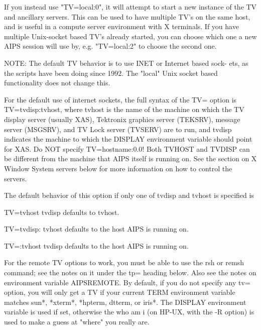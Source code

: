                If  you  instead  use  "TV=local:0",  it  will  attempt to start a new
               instance of the TV and ancillary servers.  This can be  used  to  have
               multiple  TV's  on  the  same  host, and is useful in a compute server
               environment with X terminals.  If you have multiple Unix-socket  based
               TV's already started, you can choose which one a new AIPS session will
               use by, e.g. "TV=local:2" to choose the second one.

               NOTE: The default TV behavior is to use  INET or Internet based  sock-
               ets,  as  the  scripts  have  been doing since 1992.  The "local" Unix
               socket based functionality does not change this.

               For the default use of internet sockets, the full syntax  of  the  TV=
               option is TV=tvdisp:tvhost, where tvhost is the name of the machine on
               which the TV display server (usually XAS), Tektronix  graphics  server
               (TEKSRV),  message server (MSGSRV), and TV Lock server (TVSERV) are to
               run, and tvdisp indicates the machine to which the DISPLAY environment
               variable  should point for XAS.  Do NOT specify TV=hostname:0.0!  Both
               TVHOST and TVDISP can be different from the machine that  AIPS  itself
               is  running  on.  See the section on X Window System servers below for
               more information on how to control the servers.

               The default behavior of this option  if only one of tvdisp and  tvhost
               is specified is

               TV=tvhost   tvdisp defaults to tvhost.

               TV=tvdisp:  tvhost defaults to the host AIPS is running on.

               TV=:tvhost  tvdisp defaults to the host AIPS is running on.

               For  the remote TV options to work, you must be able to use the rsh or
               remsh command; see the notes on it under the tp= heading below.   Also
               see  the notes on environment variable AIPSREMOTE.  By default, if you
               do not specify any tv= option, you will only get a TV if your  current
               TERM  environment  variable matches sun*, *xterm*, *hpterm, dtterm, or
               iris*.  The DISPLAY environment variable is used if set, otherwise the
               who  am  i  (on  HP-UX, with the -R option) is used to make a guess at
               "where" you really are.

